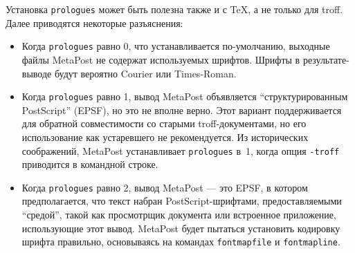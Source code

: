 \documentclass{article} %
\def\ttt{\texttt}  %
\begin{document}
\label{Dprologues}
Установка \ttt{prologues} может быть полезна также и с \TeX, а не только 
для troff.
Далее приводятся некоторые разъяснения:

\begin{itemize}
\item Когда \ttt{prologues} равно 0, что устанавливается по-умолчанию, 
выходные файлы MetaPost не содержат используемых шрифтов.
Шрифты в результате-выводе будут вероятно Courier или 
Times-Roman.

\item Когда \ttt{prologues} равно 1, вывод MetaPost объявляется 
``структурированным PostScript'' (EPSF), 
но это не вполне верно.
Этот вариант поддерживается для обратной совместимости со старыми 
troff-документами, но его использование как устаревшего не рекомендуется.
Из исторических соображений, MetaPost устанавливает \ttt{prologues} в~1, 
когда опция {\tt -troff} приводится в командной строке.

\item Когда \ttt{prologues} равно 2, вывод MetaPost --- это EPSF, в котором 
предполагается, что текст набран PostScript-шрифтами, 
предоставляемыми ``средой'', такой как просмотрщик документа или встроенное 
приложение, использующие этот вывод.
MetaPost будет пытаться установить кодировку шрифта правильно, основываясь 
на командах \ttt{fontmapfile} и \ttt{fontmapline}.


\end{itemize}
\end{document}
